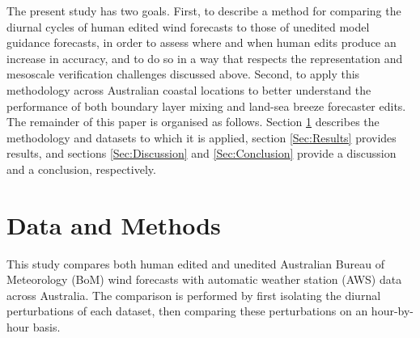 \documentclass{ametsoc}
\begin{document}
The present study has two goals. First, to describe a method for comparing the diurnal cycles of human edited wind forecasts to those of unedited model guidance forecasts, in order to assess where and when human edits produce an increase in accuracy, and to do so in a way that respects the representation and mesoscale verification challenges discussed above. Second, to apply this methodology across Australian coastal locations to better understand the performance of both boundary layer mixing and land-sea breeze forecaster edits. The remainder of this paper is organised as follows. Section \ref{Sec:Methods} describes the methodology and datasets to which it is applied, section \ref{Sec:Results} provides results, and sections \ref{Sec:Discussion} and \ref{Sec:Conclusion} provide a discussion and a conclusion, respectively.

\section{Data and Methods} \label{Sec:Methods}
This study compares both human edited and unedited Australian Bureau of Meteorology (BoM) wind forecasts with automatic weather station (AWS) data across Australia. The comparison is performed by first isolating the diurnal perturbations of each dataset, then comparing these perturbations on an hour-by-hour basis. 
\end{document}
